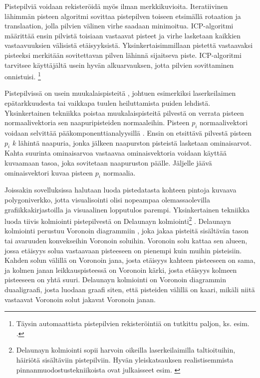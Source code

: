 Pistepilviä voidaan rekisteröidä myös ilman merkkikuvioita. Iteratiivinen lähimmän pisteen algoritmi  sovittaa pistepilven toiseen etsimällä rotaation ja translaation,
jolla pilvien välinen virhe saadaan minimoitua. ICP-algoritmi määrittää ensin pilvistä toisiaan vastaavat pisteet ja virhe lasketaan kaikkien vastaavuuksien välisistä etäisyyksistä.
Yksinkertaisimmillaan pistettä vastaavaksi pisteeksi merkitään sovitettavan pilven lähinnä sijaitseva piste. 
ICP-algoritmi tarvitsee käyttäjältä usein hyvän alkuarvauksen, jotta pilvien sovittaminen onnistuisi. 
\footnote{Täysin automaattista pistepilvien rekisteröintiä on tutkittu paljon, ks. esim. \cite{Pascal}.}

Pistepilvissä on usein muukalaispisteitä , johtuen esimerkiksi laserkeilaimen epätarkkuudesta tai vaikkapa tuulen heiluttamista puiden lehdistä. Yksinkertainen tekniikka poistaa muukalaispisteitä pilvestä on verrata pisteen normaalivektoria sen naapuripisteiden normaaleihin. Pisteen $p_i$ normaalivektori voidaan selvittää pääkomponenttianalyysillä . Ensin on etsittävä pilvestä pisteen $p_i$ $k$ lähintä naapuria, jonka jälkeen naapurston pisteistä lasketaan ominaisarvot. Kahta suurinta ominaisarvoa vastaavaa ominaisvektoria voidaan käyttää kuvaamaan tasoa, joka sovitetaan naapuruston päälle. Jäljelle jäävä ominaisvektori kuvaa pisteen $p_i$ normaalia. \cite{huang}

Joissakin sovelluksissa halutaan luoda pistedatasta kohteen pintoja kuvaava polygoniverkko, jotta visualisointi olisi nopeampaa olemassaolevilla grafiikkakirjastoilla ja visuaalinen lopputulos parempi. Yksinkertainen tekniikka luoda tiivis kolmiointi pistepilvestä on Delaunayn kolmiointi\footnote{Delaunayn kolmiointi sopii harvoin oikeilla laserkeilaimilla taltioituihin, häiriötä sisältäviin pistepilviin. Hyvän yleiskatsauksen realistisemmista pinnanmuodostustekniikoista ovat julkaisseet esim. \cite{berger}} . Delaunayn kolmiointi perustuu Voronoin diagrammiin , joka jakaa pisteitä sisältävän tason tai avaruuden konvekseihin Voronoin soluihin. Voronoin solu kattaa sen alueen, jossa etäisyys solua vastaavaan pisteeseen on pienempi kuin muihin pisteisiin. Kahden solun välillä on Voronoin jana, josta etäisyys kahteen pisteeseen on sama, ja kolmen janan leikkauspisteessä on Voronoin kärki, josta etäisyys kolmeen pisteeseen on yhtä suuri. Delaunayn kolmiointi on Voronoin diagrammin duaaligraafi, josta luodaan graafi siten, että pisteiden välillä on kaari, mikäli niitä vastaavat Voronoin solut jakavat Voronoin janan. \cite{delaunay}

